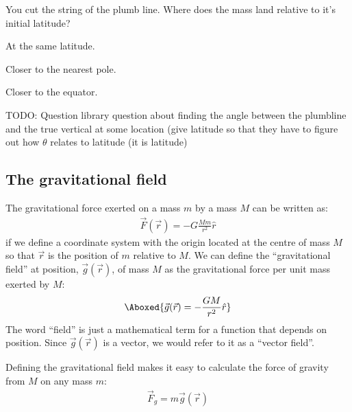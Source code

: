 
\begin{checkpoint}
\begin{MCquestion}{You cut the string of the plumb line. Where does the mass land relative to it's initial latitude?}
\item At the same latitude.
\item Closer to the nearest pole.
\item Closer to the equator. \correct
\end{MCquestion}
\end{checkpoint}




TODO: Question library question about finding the angle between the plumbline and the true vertical at some location (give latitude so that they have to figure out how $\theta$ relates to latitude (it is latitude)

\subsection{The gravitational field}
The gravitational force exerted on a mass $m$ by a mass $M$ can be written as:
\begin{align*}
\vec F(\vec r) = -G\frac{Mm}{r^2}\hat r
\end{align*}
if we define a coordinate system with the origin located at the centre of mass $M$ so that $\vec r$ is the position of $m$ relative to $M$. We can define the ``gravitational field'' at position, $\vec g(\vec r)$, of mass $M$ as the gravitational force per unit mass exerted by $M$:
\begin{align}
\Aboxed{\vec g(\vec r) = - \frac{GM}{r^2}\hat r}
\end{align}
The word ``field'' is just a mathematical term for a function that depends on position. Since $\vec g(\vec r)$ is a vector, we would refer to it as a ``vector field''.

Defining the gravitational field makes it easy to calculate the force of gravity from $M$ on any mass $m$:
\begin{align*}
\vec F_g = m\vec g(\vec r)
\end{align*}

